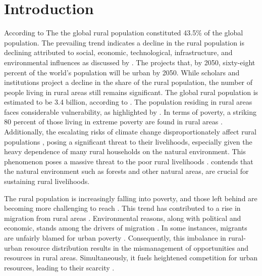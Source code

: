 \section{Introduction}\label{isect1}
According to The \cite{world2018rural} the global rural population constituted 43.5\% 
of the global population. The prevailing trend indicates a decline in the rural population is declining attributed to social, economic, technological, infrastructure, and environmental influences as discussed by \citep{jaszczak2018phenomenon}. The \cite{UNDP} projects that, by 2050, sixty-eight percent of the world’s population will be urban by 2050.
While scholars and institutions project a decline in the share of the rural population, the number of people living in rural areas still remains significant. The global rural population is estimated to be 3.4 billion, according to \cite{Worldbank2022}. The population residing in rural areas faces considerable vulnerability, as highlighted by \cite{acharya2008dimension}.  In terms of poverty, a striking 80 percent of those living in extreme poverty are found in rural areas \citep{world2021state}. Additionally, the escalating risks of climate change disproportionately affect rural populations \citep{Researchoverview2022}, posing a significant threat to their livelihoods, especially given the heavy dependence of many rural households on the natural environment. This phenomenon poses a massive threat to the poor rural livelihoods \citep{pelser2022climate}. \cite{angelsen2014environmental} contends that the natural environment such as forests and other natural areas, are crucial for sustaining rural livelihoods.\par

The rural population is increasingly falling into poverty, and those left behind are becoming more challenging to reach \citep{UN2019}. This trend has contributed to a rise in migration from rural areas \citep{lazarte2017understanding}. Environmental reasons, along with political and economic, stands among the drivers of migration \citep{mcnamara2016insecure}. In some instances, migrants are unfairly blamed for urban poverty \citep{tacoli2015rural}. Consequently, this imbalance in rural-urban resource distribution results in the mismanagement of opportunities and resources in rural areas. Simultaneously, it fuels heightened competition for urban resources, leading to their scarcity \citep{artuso2011state}. \par

